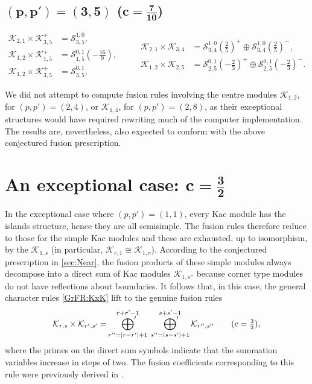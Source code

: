 \documentclass[a4paper,reqno,12pt]{report}
\theoremstyle{definition}
\numberwithin{equation}{section}
\let\originalleft\left     %
\let\originalright\right
\renewcommand{\left}{\mathopen{}\mathclose\bgroup\originalleft}
\renewcommand{\right}{\aftergroup\egroup\originalright}
\newcommand{\abs}[1]{\left\lvert #1 \right\rvert}
\newcommand{\Kac}[1]{\mathcal{K}_{#1}}       %
\newcommand{\Stag}[2]{\mathcal{S}_{#1}^{#2}} %
\newcommand{\fuse}{\mathbin{\times}}                                            %
\theoremstyle{plain}
\begin{document}
\subsection*{$\bm{(p,p') = (3,5)}$ ($\bm{c=\frac{7}{10}}$)}

\begin{equation}
\begin{aligned}
  \Kac{2,1}\fuse \Kac{3,5}^+ &= \Stag{3,5}{1,0}, \\
  \Kac{1,2}\fuse \Kac{1,5}^+ &= \Stag{1,5}{0,1}(-\tfrac{16}{9}), \\
  \Kac{1,2}\fuse \Kac{3,5}^+ &= \Stag{3,5}{0,1},
\end{aligned}
\qquad
\begin{aligned}
  \Kac{2,1}\fuse \Kac{3,4} &= \Stag{3,4}{1,0}(\tfrac{2}{5})^+ \oplus \Stag{3,4}{1,0}(\tfrac{2}{5})^-, \\
  \Kac{1,2}\fuse \Kac{2,5} &= \Stag{2,5}{0,1}(-\tfrac{2}{3})^+ \oplus \Stag{2,5}{0,1}(-\tfrac{2}{3})^-.
\end{aligned}
\end{equation}

\noindent We did not attempt to compute fusion rules involving the centre modules $\Kac{1,2}$, for $(p,p') = (2,4)$, or $\Kac{1,4}$, for $(p,p') = (2,8)$, as their exceptional structures would have required rewriting much of the computer implementation.  The results are, nevertheless, also expected to conform with the above conjectured fusion prescription.


\section{An exceptional case: $\bm{c=\frac{3}{2}}$}\label{sec:32}

In the exceptional case where $(p,p')=(1,1)$, every Kac module has the islands structure, hence they are all semisimple.  The fusion rules therefore reduce to those for the simple Kac modules and these are exhausted, up to isomorphism, by the $\Kac{1,s}$ (in particular, $\Kac{r,1} \cong \Kac{1,r}$).  According to the conjectured prescription in \cref{sec:Near}, the fusion products of these simple modules always decompose into a direct sum of Kac modules $\Kac{1,s''}$ because corner type modules do not have reflections about boundaries.  It follows that, in this case, the general character rules \eqref{GrFR:KxK} lift to the genuine fusion rules
\begin{equation}
\Kac{r,s} \fuse \Kac{r',s'} = \sideset{}{'} \bigoplus_{r'' = \abs{r-r'}+1}^{r+r'-1} \ \sideset{}{'} \bigoplus_{s'' = \abs{s-s'}+1}^{s+s'-1} \Kac{r'',s''} \qquad \text{(\(c = \tfrac{3}{2}\)),} \label{KxK}
\end{equation}
where the primes on the direct sum symbols indicate that the summation variables increase in steps of two.  The fusion coefficients corresponding to this rule were previously derived in \cite{MilFus02}.
\end{document}
